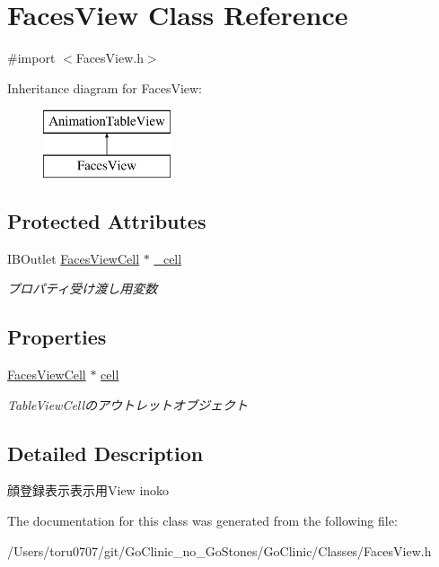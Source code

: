 \hypertarget{interface_faces_view}{
\section{FacesView Class Reference}
\label{interface_faces_view}
}


{\ttfamily \#import $<$FacesView.h$>$}

Inheritance diagram for FacesView:\begin{figure}[H]
\begin{center}
\leavevmode
\includegraphics[height=2.000000cm]{interface_faces_view}
\end{center}
\end{figure}
\subsection*{Protected Attributes}
\begin{DoxyCompactItemize}
\item 
\hypertarget{interface_faces_view_af2b84e2dad6c4ef7948a084341cad99e}{
IBOutlet \hyperlink{interface_faces_view_cell}{FacesViewCell} $\ast$ \hyperlink{interface_faces_view_af2b84e2dad6c4ef7948a084341cad99e}{\_\-cell}}
\label{interface_faces_view_af2b84e2dad6c4ef7948a084341cad99e}

\begin{DoxyCompactList}\small\item\em プロパティ受け渡し用変数 \end{DoxyCompactList}\end{DoxyCompactItemize}
\subsection*{Properties}
\begin{DoxyCompactItemize}
\item 
\hypertarget{interface_faces_view_a99afdd777d04877b3556c2fc809dd612}{
\hyperlink{interface_faces_view_cell}{FacesViewCell} $\ast$ \hyperlink{interface_faces_view_a99afdd777d04877b3556c2fc809dd612}{cell}}
\label{interface_faces_view_a99afdd777d04877b3556c2fc809dd612}

\begin{DoxyCompactList}\small\item\em TableViewCellのアウトレットオブジェクト \end{DoxyCompactList}\end{DoxyCompactItemize}


\subsection{Detailed Description}
顔登録表示表示用View  inoko 

The documentation for this class was generated from the following file:\begin{DoxyCompactItemize}
\item 
/Users/toru0707/git/GoClinic\_\-no\_\-GoStones/GoClinic/Classes/FacesView.h\end{DoxyCompactItemize}
